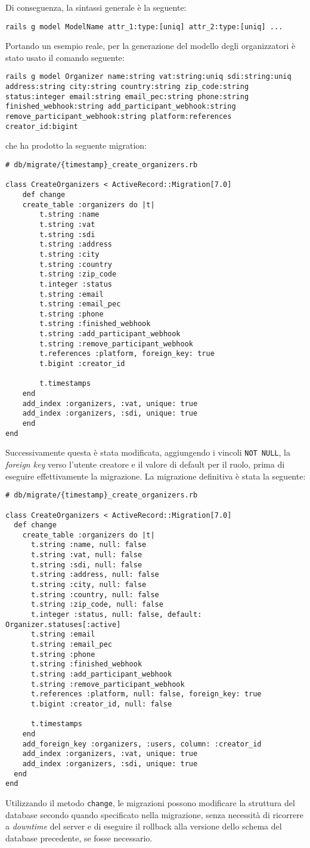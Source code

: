 Di conseguenza, la sintassi generale è la seguente:
\begin{verbatim}
rails g model ModelName attr_1:type:[uniq] attr_2:type:[uniq] ...
\end{verbatim}
Portando un esempio reale, per la generazione del modello degli organizzatori è stato usato il comando seguente:
\begin{verbatim}
rails g model Organizer name:string vat:string:uniq sdi:string:uniq address:string city:string country:string zip_code:string status:integer email:string email_pec:string phone:string finished_webhook:string add_participant_webhook:string remove_participant_webhook:string platform:references creator_id:bigint
\end{verbatim}
che ha prodotto la seguente migration:
\begin{verbatim}
# db/migrate/{timestamp}_create_organizers.rb

class CreateOrganizers < ActiveRecord::Migration[7.0]
	def change
	create_table :organizers do |t|
		t.string :name
		t.string :vat
		t.string :sdi
		t.string :address
		t.string :city
		t.string :country
		t.string :zip_code
		t.integer :status
		t.string :email
		t.string :email_pec
		t.string :phone
		t.string :finished_webhook
		t.string :add_participant_webhook
		t.string :remove_participant_webhook
		t.references :platform, foreign_key: true
		t.bigint :creator_id

		t.timestamps
	end
	add_index :organizers, :vat, unique: true
	add_index :organizers, :sdi, unique: true
	end
end
\end{verbatim}
Successivamente questa è stata modificata, aggiungendo i vincoli \verb|NOT NULL|, la \emph{foreign key} verso l'utente creatore e il valore di default per il ruolo, prima di eseguire effettivamente la migrazione. La migrazione definitiva è stata la seguente:
\begin{verbatim}
# db/migrate/{timestamp}_create_organizers.rb

class CreateOrganizers < ActiveRecord::Migration[7.0]
  def change
    create_table :organizers do |t|
      t.string :name, null: false
      t.string :vat, null: false
      t.string :sdi, null: false
      t.string :address, null: false
      t.string :city, null: false
      t.string :country, null: false
      t.string :zip_code, null: false
      t.integer :status, null: false, default: Organizer.statuses[:active]
      t.string :email
      t.string :email_pec
      t.string :phone
      t.string :finished_webhook
      t.string :add_participant_webhook
      t.string :remove_participant_webhook
      t.references :platform, null: false, foreign_key: true
      t.bigint :creator_id, null: false

      t.timestamps
    end
    add_foreign_key :organizers, :users, column: :creator_id
    add_index :organizers, :vat, unique: true
    add_index :organizers, :sdi, unique: true
  end
end
\end{verbatim}
Utilizzando il metodo \verb|change|, le migrazioni possono modificare la struttura del database secondo quando specificato nella migrazione, senza necessità di ricorrere a \emph{downtime} del server e di eseguire il rollback alla versione dello schema del database precedente, se fosse necessario.

